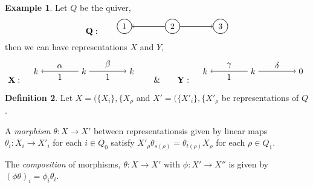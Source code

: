 \documentclass[11.5pt, twoside, a4paper, titlepage]{report}
\theoremstyle{definition}
\newtheorem{mydef}{Definition}[section]
\newtheorem{eg}[mydef]{Example}
\theoremstyle{plain}
\begin{document}
\begin{eg}
Let $Q$ be the quiver, 
\begin{equation*}
\mathbf{Q}: \qquad
\begin{tikzpicture}[->,-latex, auto, every path/.style={->, semithick}, main node/.style={draw, circle}]
\node	[main node]		(1) at (0,0)		{1};
\node [main node]		(2) at (2,0)		{2};
\node [main node]		(3) at (4,0)		{3};

\draw (2) edge (1);
\draw (2) edge (3);
\end{tikzpicture}
\end{equation*}
then we can have representations $X$ and $Y$, 
\begin{equation*}
\mathbf{X}: \quad
\begin{tikzpicture}[->,-latex, auto, every path/.style={->, semithick}, main node/.style={draw, circle}]
\node	[]		(1) at (0,0)		{$k$};
\node []		(2) at (2,0)		{$k$};
\node []		(3) at (4,0)		{$k$};

\draw (2) edge node [auto, swap] {$\alpha$} node [auto] {1} (1);
\draw (2) edge node [auto] {$\beta$} node [auto, swap] {1} (3);
\end{tikzpicture}
\qquad \& \qquad
\mathbf{Y}: \quad
\begin{tikzpicture}[->,-latex, auto, every path/.style={->, semithick}, main node/.style={draw, circle}]
\node	[]		(1) at (0,0)		{$k$};
\node []		(2) at (2,0)		{$k$};
\node []		(3) at (4,0)		{$0$};

\draw (2) edge node [auto, swap] {$\gamma$} node [auto] {1} (1);
\draw (2) edge node [auto] {$\delta$} (3);
\end{tikzpicture}
\end{equation*}
\end{eg}

\begin{mydef}
Let $X=(\{X_i\}, \{X_{\rho}$ and $X'=(\{X'_i\}, \{X'_{\rho}$ be representations of $Q$. 
\begin{description}
\item A \emph{morphism} $\theta: X \to X'$ between representationsis given by linear maps $\theta_i:X_i \to X'_i$ for each $i\in Q_0$ satisfy $X'_{\rho}\theta _{s(\rho)} = \theta_{t(\rho)}X_{\rho}$ for each $\rho \in Q_1$. 
\item The \emph{composition} of morphisms, $\theta: X \to X'$ with $\phi: X' \to X''$ is given by $(\phi \theta)_i=\phi_i \theta_i$.
\end{description}
\end{mydef}
\end{document}
